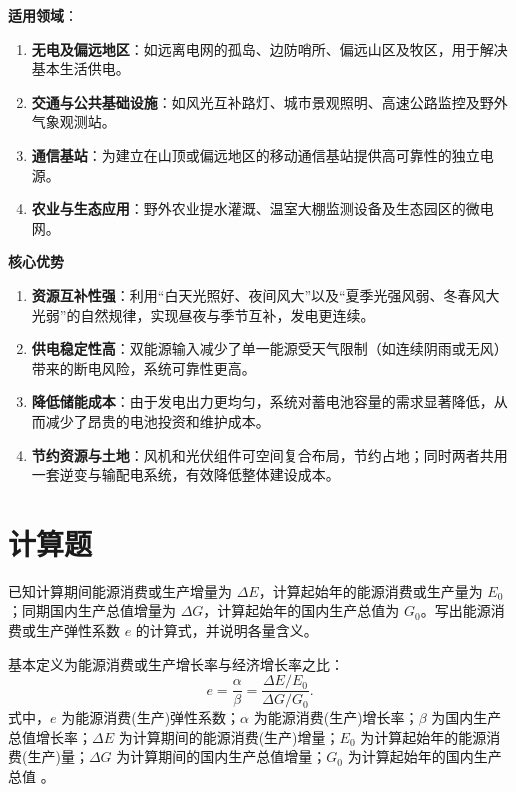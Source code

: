 \begin{solution}
\textbf{适用领域}：
\begin{enumerate}
\item \textbf{无电及偏远地区}：如远离电网的孤岛、边防哨所、偏远山区及牧区，用于解决基本生活供电。
\item \textbf{交通与公共基础设施}：如风光互补路灯、城市景观照明、高速公路监控及野外气象观测站。
\item \textbf{通信基站}：为建立在山顶或偏远地区的移动通信基站提供高可靠性的独立电源。
\item \textbf{农业与生态应用}：野外农业提水灌溉、温室大棚监测设备及生态园区的微电网。
\end{enumerate}
\textbf{核心优势}
\begin{enumerate}
\item \textbf{资源互补性强}：利用“白天光照好、夜间风大”以及“夏季光强风弱、冬春风大光弱”的自然规律，实现昼夜与季节互补，发电更连续。
\item \textbf{供电稳定性高}：双能源输入减少了单一能源受天气限制（如连续阴雨或无风）带来的断电风险，系统可靠性更高。
\item \textbf{降低储能成本}：由于发电出力更均匀，系统对蓄电池容量的需求显著降低，从而减少了昂贵的电池投资和维护成本。
\item \textbf{节约资源与土地}：风机和光伏组件可空间复合布局，节约占地；同时两者共用一套逆变与输配电系统，有效降低整体建设成本。
\end{enumerate}
\end{solution}

\section{计算题}

\begin{problem}[能源消费或生产弹性系数]\label{exer:calc_01_intro_p041_01}
已知计算期间能源消费或生产增量为 \(\Delta E\)，计算起始年的能源消费或生产量为 \(E_0\)；同期国内生产总值增量为 \(\Delta G\)，计算起始年的国内生产总值为 \(G_0\)。写出能源消费或生产弹性系数 \(e\) 的计算式，并说明各量含义。
\end{problem}

\begin{solution}
基本定义为能源消费或生产增长率与经济增长率之比：
\begin{equation}
e = \frac{\alpha}{\beta}
  = \frac{\Delta E / E_0}{\Delta G / G_0}.
\end{equation}
式中，\(e\) 为能源消费(生产)弹性系数；\(\alpha\) 为能源消费(生产)增长率；\(\beta\) 为国内生产总值增长率；\(\Delta E\) 为计算期间的能源消费(生产)增量；\(E_{0}\) 为计算起始年的能源消费(生产)量；\(\Delta G\) 为计算期间的国内生产总值增量；\(G_{0}\) 为计算起始年的国内生产总值 。
\end{solution}

